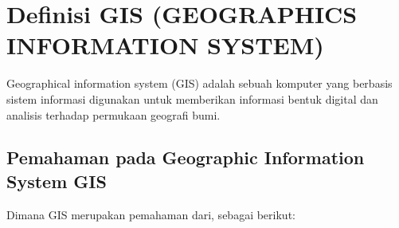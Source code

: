 
\section{Definisi GIS (GEOGRAPHICS INFORMATION SYSTEM)}
Geographical information system (GIS) adalah sebuah komputer yang berbasis sistem
informasi digunakan untuk memberikan informasi bentuk digital dan analisis terhadap 
permukaan geografi bumi.

\subsection{Pemahaman pada Geographic Information System GIS}
Dimana GIS merupakan pemahaman dari, sebagai berikut:
